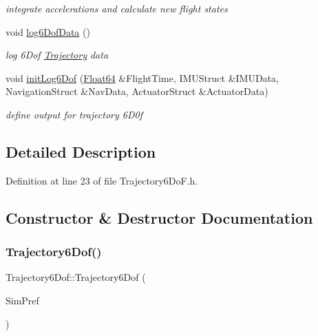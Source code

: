\begin{DoxyCompactItemize}
\begin{DoxyCompactList}\small\item\em integrate accelerations and calculate new flight states \end{DoxyCompactList}\item 
void \hyperlink{class_trajectory6_dof_aba4e6960a6cec1decfb7f887ddc55c26}{log6\+Dof\+Data} ()
\begin{DoxyCompactList}\small\item\em log 6\+Dof \hyperlink{class_trajectory}{Trajectory} data \end{DoxyCompactList}\item 
void \hyperlink{class_trajectory6_dof_ad0695ba90c621c01a6abc0da03fd8329}{init\+Log6\+Dof} (\hyperlink{group___tools_ga3f1431cb9f76da10f59246d1d743dc2c}{Float64} \&Flight\+Time, I\+M\+U\+Struct \&I\+M\+U\+Data, Navigation\+Struct \&Nav\+Data, Actuator\+Struct \&Actuator\+Data)
\begin{DoxyCompactList}\small\item\em define output for trajectory 6\+D0f \end{DoxyCompactList}\end{DoxyCompactItemize}


\subsection{Detailed Description}


Definition at line 23 of file Trajectory6\+Do\+F.\+h.



\subsection{Constructor \& Destructor Documentation}
\mbox{\label{class_trajectory6_dof_a1742bd5d7245f2bd1fb7fadf0ba23e0a}} 
\subsubsection{\texorpdfstring{Trajectory6\+Dof()}{Trajectory6Dof()}}
{\footnotesize\ttfamily Trajectory6\+Dof\+::\+Trajectory6\+Dof (\begin{DoxyParamCaption}\item[{Sim\+D\+Preference \&}]{Sim\+Pref }\end{DoxyParamCaption})}



